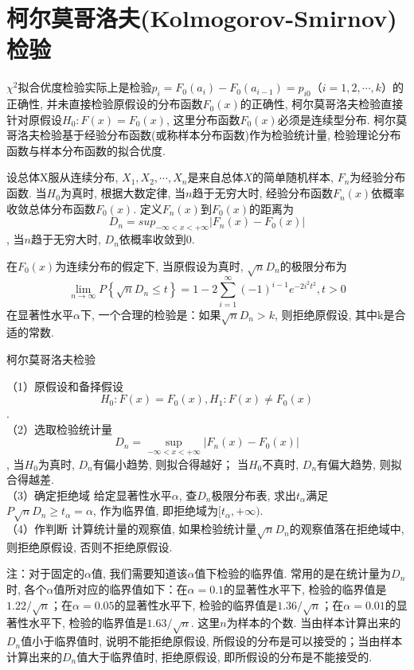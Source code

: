 \section{柯尔莫哥洛夫(Kolmogorov-Smirnov)检验}

$\chi^2$拟合优度检验实际上是检验$p_i=F_0(a_i)-F_0(a_{i-1})=p_{i0}（i=1,2,\cdots,k）$的正确性, 并未直接检验原假设的分布函数$F_0(x)$的正确性, 柯尔莫哥洛夫检验直接针对原假设$H_0:F(x)=F_0(x)$, 这里分布函数$F_0(x)$必须是连续型分布. 柯尔莫哥洛夫检验基于经验分布函数(或称样本分布函数)作为检验统计量, 检验理论分布函数与样本分布函数的拟合优度. 

设总体X服从连续分布, $X_1,X_2,\cdots,X_n$是来自总体$X$的简单随机样本, $F_n$为经验分布函数. 当$H_0$为真时, 根据大数定律, 当$n$趋于无穷大时, 经验分布函数$F_n(x)$依概率收敛总体分布函数$F_0(x)$. 定义$F_n(x)$到$F_0(x)$的距离为
$$D_n={sup}_{-\infty<x<+\infty}\left|F_n(x)-F_0(x)\right|$$, 
当$n$趋于无穷大时, $D_n$依概率收敛到$0$. 

\begin{theorem}[Kolmogorov定理]  
    在$F_0(x)$为连续分布的假定下, 当原假设为真时, $\sqrt n D_n$的极限分布为
$$ \lim _{n \rightarrow \infty} P\left\{\sqrt{n} D_{n} \leq t\right\}=1-2 \sum_{i=1}^{\infty}(-1)^{i-1} e^{-2 i^{2} t^{2}}, t>0 $$  
在显著性水平$\alpha$下, 一个合理的检验是：如果$\sqrt n D_n>k$, 则拒绝原假设, 其中k是合适的常数.    
\end{theorem}

\begin{algorithm}[]
    \caption{柯尔莫哥洛夫检验}
     （1）原假设和备择假设
$$  H_0:F(x)=F_0(x), H_1:F(x)\neq F_0(x)$$.\\
（2）选取检验统计量
$$D_n=\operatorname{sup}_{-\infty<x<+\infty} \left|F_n(x)-F_0(x)\right|$$, 
当$H_0$为真时, $D_n$有偏小趋势, 则拟合得越好；
当$H_0$不真时, $D_n$有偏大趋势, 则拟合得越差. \\
（3）确定拒绝域
给定显著性水平$\alpha$, 查$D_n$极限分布表, 求出$t_\alpha$满足
$P{\sqrt n D_n\geq t_\alpha}=\alpha$, 
作为临界值, 即拒绝域为$[t_\alpha,+\infty)$. \\
（4）作判断
计算统计量的观察值, 如果检验统计量$\sqrt n D_n$的观察值落在拒绝域中, 则拒绝原假设, 否则不拒绝原假设.    
\end{algorithm}

注：对于固定的$\alpha$值, 我们需要知道该$\alpha$值下检验的临界值. 常用的是在统计量为$D_n$时, 各个$\alpha$值所对应的临界值如下：在$\alpha=0.1$的显著性水平下, 检验的临界值是$1.22/\sqrt n$；在$\alpha=0.05$的显著性水平下, 检验的临界值是$1.36/\sqrt n$；在$\alpha=0.01$的显著性水平下, 检验的临界值是$1.63/\sqrt n$. 这里$n$为样本的个数. 当由样本计算出来的$D_n$值小于临界值时, 说明不能拒绝原假设, 所假设的分布是可以接受的；当由样本计算出来的$D_n$值大于临界值时, 拒绝原假设, 即所假设的分布是不能接受的. 

